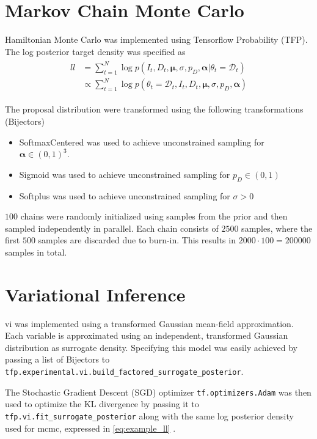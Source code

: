 \section{Markov Chain Monte Carlo}
Hamiltonian Monte Carlo was implemented using Tensorflow Probability (TFP). The log posterior target density was specified as 
\begin{align}\label{eq:example_ll}
\begin{split}
    ll &= \sum_{t=1}^N \log p(I_t, D_t, \boldsymbol{\mu}, \sigma, p_D, \boldsymbol{\alpha} | \theta_t = \mathcal{D}_t)\\
    &\propto \sum_{t=1}^{N}\log p(\theta_t = \mathcal{D}_t, I_t, D_t, \boldsymbol{\mu}, \sigma, p_D, \boldsymbol{\alpha})
\end{split}
\end{align}

The proposal distribution were transformed using the following transformations (Bijectors)

\begin{itemize}
\item SoftmaxCentered was used to achieve unconstrained sampling for $\boldsymbol{\alpha} \in (0, 1)^3$.
\item Sigmoid was used to achieve unconstrained sampling for $p_D \in (0, 1)$
\item Softplus was used to achieve unconstrained sampling for $\sigma > 0$
\end{itemize}

$100$ chains were randomly initialized using samples from the prior and then sampled independently in parallel. Each chain consists of $2500$ samples, where the first $500$ samples are discarded due to burn-in. This results in $2000 \cdot 100 = 200000$ samples in total. 

\section{Variational Inference}

\acrshort{vi} was implemented using a transformed Gaussian mean-field approximation. Each variable is approximated using an independent, transformed Gaussian distribution as surrogate density. Specifying this model was easily achieved by passing a list of Bijectors to \texttt{tfp.experimental.vi.build\_factored\_surrogate\_posterior}. 

The Stochastic Gradient Descent (SGD) optimizer \texttt{tf.optimizers.Adam} was then used to optimize the KL divergence by passing it to \texttt{tfp.vi.fit\_surrogate\_posterior} along with the same log posterior density used for \acrshort{mcmc}, expressed in \cref{eq:example_ll} \cite{tensorflow2015-whitepaper}. 

